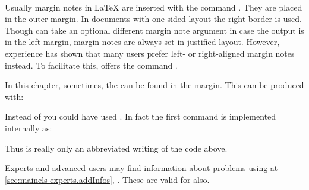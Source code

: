 \begin{Declaration}
  \\
\end{Declaration}%
%
%
Usually margin notes in {\LaTeX} are
inserted with the command . They are placed in the
outer margin.  In documents with one-sided layout the right border is
used. Though  can take an optional different margin
note argument in case the output is in the left margin, margin notes
are always set in justified layout.  However, experience has shown
that many users prefer left- or right-aligned margin notes instead.
To facilitate this, {\KOMAScript} offers the command
.
\ifCommonscrlttr\else
\begin{Example}
  \label{desc:\csname
    label@base\endcsname.cmd.marginline.example}%
  In this chapter, sometimes, the 
  can be found in the margin. This can be produced with:%
\iffalse%
  \footnote{In fact, instead of
    \Macro{texttt}, a semantic highlighting was used. To avoid
    confusion this was replaced in the example.}
\fi
\ifCommonmaincls
\begin{lstcode}
\end{lstcode}
\else
\begin{lstcode}
\end{lstcode}
\fi

  Instead of  you could have used . In fact
  the first command is implemented internally as:
\ifCommonmaincls
\begin{lstcode}
\end{lstcode}
\else
\begin{lstcode}
\end{lstcode}
\fi
  Thus  is really only an abbreviated writing of the
  code above.%
\end{Example}%

Experts and advanced users may find information about
problems using  at \autoref{sec:maincls-experts.addInfos},
. These are valid for
 also.%
\fi%
%
%
%
%
%
%
\fi %


